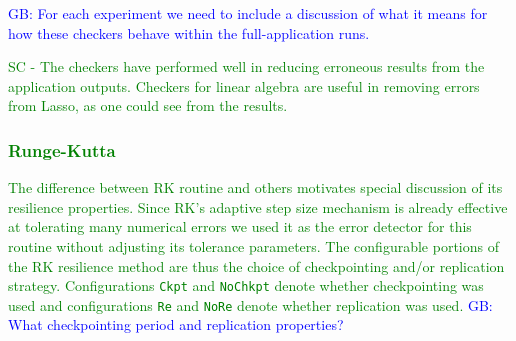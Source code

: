 \documentclass{sig-alternate}
\newcommand{\sui}[1]{%
  \textcolor{green}{SC - #1}
}
\newcommand{\greg}[1]{%
  \textcolor{blue}{GB: #1}
}
\begin{document}

\greg{For each experiment we need to include a discussion of what it means for how these checkers behave within the full-application runs.}

\sui{The checkers have performed well in reducing erroneous results from the application outputs. Checkers for linear algebra are useful in removing errors from Lasso, as one could see from the results.




\subsubsection{Runge-Kutta}
\label{sec:res_tech:eval:rk}

The difference between RK routine and others motivates special discussion of its resilience properties.
Since RK's adaptive step size mechanism is already effective at tolerating many numerical errors we used it as the error detector for this routine without adjusting its tolerance parameters.
The configurable portions of the RK resilience method are thus the choice of checkpointing and/or replication strategy.
Configurations \texttt{Ckpt} and \texttt{NoChkpt} denote whether checkpointing was used and configurations \texttt{Re} and \texttt{NoRe} denote whether replication was used.
\greg{What checkpointing period and replication properties?}

}
\end{document}

